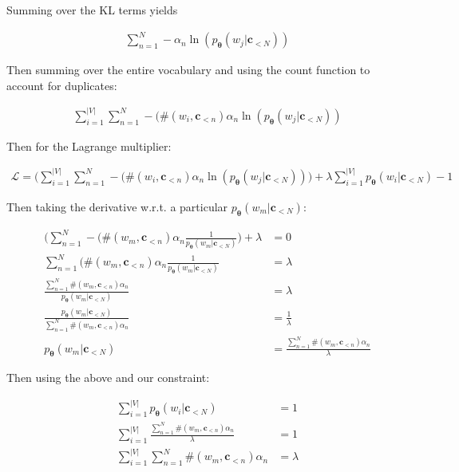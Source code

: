 \documentclass{article}
\newcommand{\vtheta}{\boldsymbol{\theta}}
\newcommand{\model}{p_{\vtheta}}
\newcommand{\context}{\boldsymbol{c}}
\begin{document}
			Summing over the KL terms yields
			
			\begin{align}
				\sum^N_{n=1}  -\alpha_n \ln(\model(w_j| \context_{<N}))		
			\end{align}
						
			Then summing over the entire vocabulary and using the count function to account for duplicates:
		
			\begin{align}
				\sum^{|V|}_{i=1} \sum^N_{n=1}  -(\#(w_i, \context_{<n})\alpha_n \ln(\model(w_j| \context_{<N}))		
			\end{align}
			
			Then for the Lagrange multiplier:
			
			\begin{align}
				\mathcal{L} = \bigg(\sum^{|V|}_{i=1} \sum^N_{n=1}  -(\#(w_i, \context_{<n})\alpha_n \ln(\model(w_j| \context_{<N}))	\bigg) + \lambda\sum^{|V|}_{i=1} \model(w_i|\context_{<N}) - 1	
			\end{align}
			
			Then taking the derivative w.r.t. a particular $\model(w_m|\context_{<N})$:
			
			\begin{align}
				\bigg(\sum^N_{n=1}  -(\#(w_m, \context_{<n})\alpha_n \frac{1}{\model(w_m| \context_{<N})}	\bigg) + \lambda &= 0\\
				\sum^N_{n=1} (\#(w_m, \context_{<n})\alpha_n \frac{1}{\model(w_m| \context_{<N})}  &= \lambda	\\
				\frac{\sum^N_{n=1} \#(w_m, \context_{<n})\alpha_n}{\model(w_m| \context_{<N})}  &= \lambda\\
				\frac{\model(w_m| \context_{<N})}{\sum^N_{n=1} \#(w_m, \context_{<n})\alpha_n}  &= \frac{1}{\lambda}\\
				\model(w_m| \context_{<N})  &= \frac{\sum^N_{n=1} \#(w_m, \context_{<n})\alpha_n}{\lambda}
			\end{align}
			
			Then using the above and our constraint:
			
			\begin{align}
				\sum^{|V|}_{i=1} \model(w_i|\context_{<N}) &= 1\\
				\sum^{|V|}_{i=1} \frac{\sum^N_{n=1} \#(w_m, \context_{<n})\alpha_n}{\lambda} &= 1\\
				\sum^{|V|}_{i=1} \sum^N_{n=1} \#(w_m, \context_{<n})\alpha_n &= \lambda
			\end{align}
			
\end{document}
